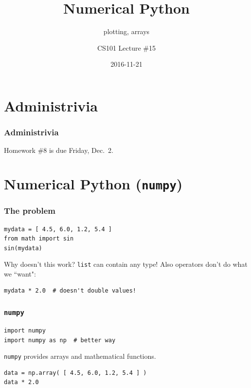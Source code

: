 \documentclass[11pt]{beamer}
\title{Numerical Python}
\subtitle{plotting, arrays}
\author{CS101 Lecture \#15}
\date{2016-11-21}
\begin{document}
  \setcounter{showProgressBar}{0}
  \setcounter{showSlideNumbers}{0}

\frame{\titlepage}

\setcounter{framenumber}{0}
\setcounter{showProgressBar}{1}
\setcounter{showSlideNumbers}{1}

\section{Administrivia}

\begin{frame}
  \frametitle{Administrivia}
  \Enlarge

  \begin{itemize}
  \myitem  Homework \#8 is due Friday, Dec.\ 2.
  \end{itemize}
\end{frame}


\section{Numerical Python (\texttt{numpy})}

\begin{frame}[fragile]
  \frametitle{The problem}
  \Enlarge

  \begin{Verbatim}
mydata = [ 4.5, 6.0, 1.2, 5.4 ]
from math import sin
sin(mydata)
  \end{Verbatim}
  \begin{enumerate}
  \myitem  Why doesn't this work? %
  \mysubitem  \texttt{list} can contain any type!
  \myitem  Also operators don't do what we ``want":
  \end{enumerate}
  \begin{Verbatim}
mydata * 2.0  # doesn't double values!
  \end{Verbatim}
\end{frame}

\begin{frame}[fragile]
  \frametitle{\texttt{numpy}}
  \Enlarge

  \begin{Verbatim}
import numpy
import numpy as np  # better way
  \end{Verbatim}
  \begin{enumerate}
  \myitem  \texttt{numpy} provides arrays and mathematical functions.
  \end{enumerate}
  \begin{Verbatim}
data = np.array( [ 4.5, 6.0, 1.2, 5.4 ] )
data * 2.0
  \end{Verbatim}
\end{frame}
\end{document}
